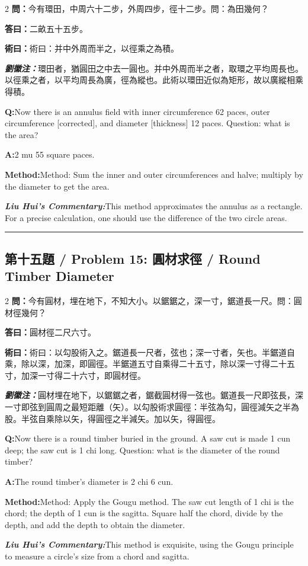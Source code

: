 \documentclass[11pt,a4paper]{article}
\newcommand{\cnwen}{\textcolor{cnlabelfg}{\textbf{問：}}}
\newcommand{\cnda}{\textbf{答曰：}}
\newcommand{\cnshu}{\textcolor{cnlabelfg}{\textbf{術曰：}}}
\newcommand{\cnzhu}{\textcolor{commentarycolor}{\textit{\textbf{劉徽注：}}}}
\newcommand{\enwen}{\textcolor{enlabelfg}{\textbf{Q:}}}
\newcommand{\enda}{\textcolor{enlabelfg}{\textbf{A:}}}
\newcommand{\enshu}{\textcolor{enlabelfg}{\textbf{Method:}}}
\newcommand{\enzhu}{\textcolor{enlabelfg}{\textit{\textbf{Liu Hui's Commentary:}}}}
\begin{document}
\begin{paracol}{2}
\switchcolumn[0]
\cnwen 今有環田，中周六十二步，外周四步，徑十二步。問：為田幾何？

\cnda 二畝五十五步。

\cnshu 術曰：并中外周而半之，以徑乘之為積。

\cnzhu 環田者，猶圓田之中去一圓也。并中外周而半之者，取環之平均周長也。以徑乘之者，以平均周長為廣，徑為縱也。此術以環田近似為矩形，故以廣縱相乘得積。

\switchcolumn[1]
\enwen Now there is an annulus field with inner circumference 62 paces, outer circumference [corrected], and diameter [thickness] 12 paces. Question: what is the area?

\enda 2 mu 55 square paces.

\enshu Method: Sum the inner and outer circumferences and halve; multiply by the diameter to get the area.

\enzhu This method approximates the annulus as a rectangle. For a precise calculation, one should use the difference of the two circle areas.
\end{paracol}

\bigskip\hrule\bigskip

\subsection{第十五題 / Problem 15: 圓材求徑 / Round Timber Diameter}

\begin{paracol}{2}
\switchcolumn[0]
\cnwen 今有圓材，埋在地下，不知大小。以鋸鋸之，深一寸，鋸道長一尺。問：圓材徑幾何？

\cnda 圓材徑二尺六寸。

\cnshu 術曰：以勾股術入之。鋸道長一尺者，弦也；深一寸者，矢也。半鋸道自乘，除以深，加深，即圓徑。半鋸道五寸自乘得二十五寸，除以深一寸得二十五寸，加深一寸得二十六寸，即圓材徑。

\cnzhu 圓材埋在地下，以鋸鋸之者，鋸截圓材得一弦也。鋸道長一尺即弦長，深一寸即弦到圓周之最短距離（矢）。以勾股術求圓徑：半弦為勾，圓徑減矢之半為股。半弦自乘除以矢，得圓徑之半減矢。加以矢，得圓徑。

\switchcolumn[1]
\enwen Now there is a round timber buried in the ground. A saw cut is made 1 cun deep; the saw cut is 1 chi long. Question: what is the diameter of the round timber?

\enda The round timber's diameter is 2 chi 6 cun.

\enshu Method: Apply the Gougu method. The saw cut length of 1 chi is the chord; the depth of 1 cun is the sagitta. Square half the chord, divide by the depth, and add the depth to obtain the diameter.

\enzhu This method is exquisite, using the Gougu principle to measure a circle's size from a chord and sagitta.
\end{paracol}
\end{document}
